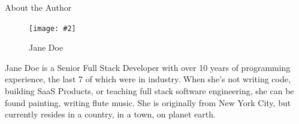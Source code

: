 \documentclass[a4paper,headinclude=on,footinclude=on,12pt,oneside]{scrbook}
\newcommand{\standardfigure}[3]{\begin{figure}[H]\begin{center}\texttt{[image: \#2]}\caption{#3}\label{fig:#2}\end{center}\end{figure}}
\begin{document}
\printindex
{}


About the Author

\standardfigure{\textwidth/2}{about/author}{Jane Doe}

Jane Doe is a Senior Full Stack Developer with over 10 years of programming experience, the last 7 of which were in industry. When she's not writing code, building SaaS Products, or teaching full stack software engineering, she can be found painting, writing flute music. She is originally from New York City, but currently resides in a country, in a town, on planet earth.
\end{document}
